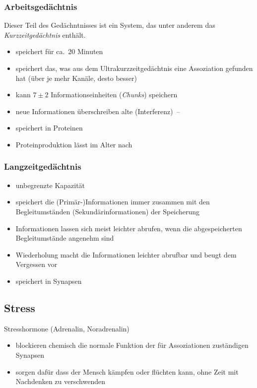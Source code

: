 \subsubsection{Arbeitsgedächtnis}
Dieser Teil des Gedächntnisses ist ein System, das unter anderem das \emph{Kurzzeitgedächtnis} enthält.
\begin{itemize}
  \item speichert für ca.~20 Minuten
  \item speichert das, was aus dem Ultrakurzzeitgedächtnis eine Assoziation gefunden hat (über je mehr Kanäle, desto besser)
  \item kann $7\pm 2$ Informationseinheiten (\emph{Chunks}) speichern
  \item neue Informationen überschreiben alte (Interferenz)~-- 
  \item speichert in Proteinen
  \item Proteinproduktion lässt im Alter nach
\end{itemize}

\subsubsection{Langzeitgedächtnis}
\begin{itemize}
  \item unbegrenzte Kapazität
  \item speichert die (Primär-)Informationen immer zusammen mit den Begleitumständen (Sekundärinformationen) der Speicherung
  \item Informationen lassen sich meist leichter abrufen, wenn die abgespeicherten Begleitumstände angenehm sind
  \item Wiederholung macht die Informationen leichter abrufbar und beugt dem Vergessen vor
  \item speichert in Synapsen
\end{itemize}

\subsection{Stress}
Stresshormone (Adrenalin, Noradrenalin)
\begin{itemize}
  \item blockieren chemisch die normale Funktion der für Assoziationen zuständigen Synapsen
  \item sorgen dafür dass der Mensch kämpfen oder flüchten kann, ohne Zeit mit Nachdenken zu verschwenden
\end{itemize}

